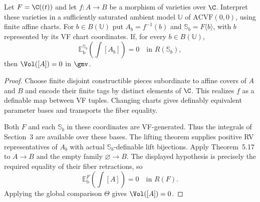 \begin{cor}\label{cor:global:vanishing}
Let $F=\C((t))$ and let $f:A\to B$ be a morphism of
varieties over $\C$.
Interpret these varieties in a sufficiently saturated
ambient model $\mathbb U$ of $\mathrm{ACVF}(0,0)$, using
finite affine charts.
For $b\in B(\mathbb U)$ put $A_b=f^{-1}(b)$ and
$\mathbb S_b=F\langle b\rangle$, with $b$ represented by its
VF chart coordinates.
If, for every $b\in B(\mathbb U)$,
\[
 \mathbb E_{\mathrm b}^{\mathbb S_b}\!
       \left(\int[A_b]\right)=0
       \quad\text{in }R(\mathbb S_b),
\]
then $\Vol([A])=0$ in $\gmv$.
\end{cor}

\begin{proof}
Choose finite disjoint constructible pieces subordinate to
affine covers of $A$ and $B$ and encode their finite tags
by distinct elements of $\C$.
This realizes $f$ as a definable map between VF tuples.
Changing charts gives definably equivalent parameter
bases and transports the fiber equality.

Both $F$ and each $\mathbb S_b$ in these coordinates are
VF-generated. Thus the integrals of Section~3 are
available over these bases.
The lifting theorem supplies positive RV representatives
of $A_b$ with actual $\mathbb S_b$-definable lift bijections.
Apply Theorem~5.17 to $A\to B$ and the empty family
$\varnothing\to B$.
The displayed hypothesis is precisely the required
equality of their fiber retractions, so
\[
 \mathbb E_{\mathrm b}^{F}\!
       \left(\int[A]\right)=0
       \quad\text{in }R(F).
\]
Applying the global comparison $\Theta$ gives
$\Vol([A])=0$.
\end{proof}
